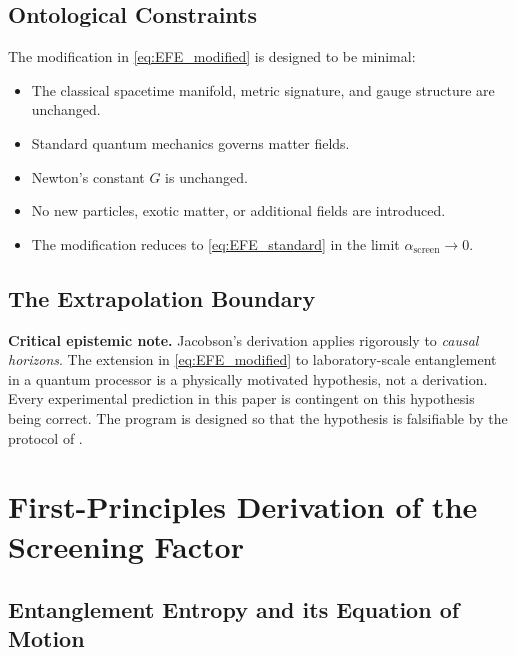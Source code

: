\documentclass[12pt,a4paper]{article}
\theoremstyle{monette}
\theoremstyle{definition}
\newcommand{\asc}{\alpha_{\mathrm{screen}}}
\begin{document}
\subsection{Ontological Constraints}

The modification in \cref{eq:EFE_modified} is designed to be minimal:
\begin{itemize}[nosep]
  \item The classical spacetime manifold, metric signature, and gauge structure
        are unchanged.
  \item Standard quantum mechanics governs matter fields.
  \item Newton's constant $G$ is unchanged.
  \item No new particles, exotic matter, or additional fields are introduced.
  \item The modification reduces to \cref{eq:EFE_standard} in the limit $\asc\to 0$.
\end{itemize}

\subsection{The Extrapolation Boundary}

\begin{notebox}
\textbf{Critical epistemic note.}
Jacobson's derivation applies rigorously to \emph{causal horizons}.
The extension in \cref{eq:EFE_modified} to laboratory-scale entanglement
in a quantum processor is a physically motivated hypothesis, not a derivation.
Every experimental prediction in this paper is contingent on this hypothesis
being correct. The program is designed so that the hypothesis is falsifiable
by the protocol of .
\end{notebox}

\section{First-Principles Derivation of the Screening Factor}
\label{sec:lindblad}

\subsection{Entanglement Entropy and its Equation of Motion}
\label{sec:SA_eom}
\end{document}
